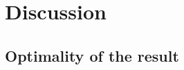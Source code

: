 \documentclass[11pt,a4paper,titlepage]{memoir}
\begin{document}
\section{Discussion}
\subsection{Optimality of the result}
%
\appendix


\backmatter



\end{document}
